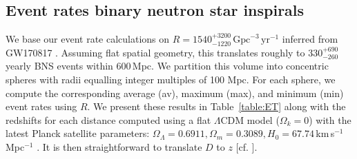 \documentclass{aa}
\begin{document}
\subsection{Event rates binary neutron star inspirals}
We base our event rate calculations on $R=1540^{+3200}_{-1220}\,\text{Gpc}^{-3}\,\text{yr}^{-1}$ inferred from GW170817 \citep{GW170817}. Assuming flat spatial geometry, this translates roughly to $330^{+690}_{-260}$ yearly BNS events within 600\,Mpc. We partition this volume into concentric spheres with radii equalling integer multiples of 100 Mpc. For each sphere, we compute the corresponding average (av), maximum (max), and minimum (min) event rates using $R$. We present these results in Table~\ref{table:ET} along with the redshifts for
each distance computed using a flat $\Lambda$CDM model ($\Omega_k=0$) with the latest Planck satellite parameters: 
$\Omega_\Lambda = 0.6911, \Omega_m = 0.3089, H_0 = 67.74\,$km\,s$^{-1}\,$Mpc$^{-1}$ \citep{Planck2015}. %
It is then straightforward to translate $D$ to $z$ [cf. \cite{Hogg:1999ad}].
%
%
%
%
\end{document}
